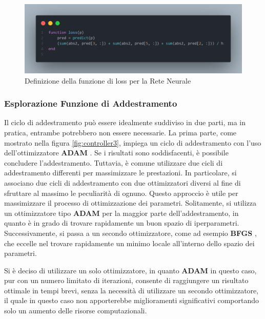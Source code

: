 \begin{figure}[H]
    \begin{center}
		\includegraphics[width=\textwidth]{img/loss.png}
		\caption{Definizione della funzione di loss per la Rete Neurale}
		\label{fig:lossFunction}
	\end{center}
\end{figure}

\subsubsection{Esplorazione Funzione di Addestramento}

Il ciclo di addestramento può essere idealmente suddiviso in due parti, 
ma in pratica, entrambe potrebbero non essere necessarie. 
La prima parte, come mostrato nella figura \ref{fig:controller3}, 
impiega un ciclo di addestramento con l'uso dell'ottimizzatore 
\textbf{ADAM} \cite{kingma2017adam}. Se i risultati sono soddisfacenti, è possibile 
concludere l'addestramento. Tuttavia, è comune utilizzare due cicli 
di addestramento differenti per massimizzare le prestazioni. 
In particolare, si associano due cicli di addestramento con due 
ottimizzatori diversi al fine di sfruttare al massimo le peculiarità 
di ognuno. Questo approccio è utile per massimizzare il processo di 
ottimizzazione dei parametri. Solitamente, si utilizza un 
ottimizzatore tipo \textbf{ADAM} per la maggior parte dell'addestramento, 
in quanto è in grado di trovare rapidamente un buon spazio di iperparametri. 
Successivamente, si passa a un secondo ottimizzatore, come ad esempio 
\textbf{BFGS} \cite{10.1093/imamat/6.1.76} \cite{35d0019d-775a-3628-b0b4-67be112e346b} \cite{e3177091-3094-3792-9d61-0ab445735ddb}, che eccelle nel trovare rapidamente un minimo locale 
all'interno dello spazio dei parametri.

Si è deciso di utilizzare un solo ottimizzatore, in quanto \textbf{ADAM} 
in questo caso, pur con un numero limitato di iterazioni, consente di 
raggiungere un risultato ottimale in tempi brevi, senza la necessità di 
utilizzare un secondo ottimizzatore, il quale in questo caso non 
apporterebbe miglioramenti significativi comportando solo un aumento 
delle risorse computazionali.


